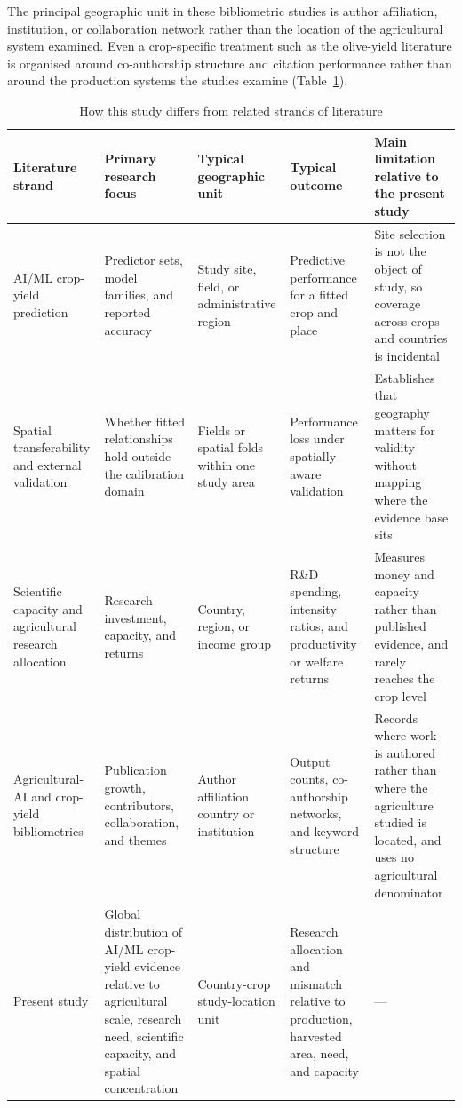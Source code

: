 \documentclass[ASNA,twocolumn]{USG}
\begin{document}
The principal geographic unit in these bibliometric studies is author affiliation,
institution, or collaboration network rather than the location of the agricultural system
examined. Even a crop-specific treatment such as the olive-yield literature is organised
around co-authorship structure and citation performance rather than around the production
systems the studies examine \cite{Toscano2026} (Table~\ref{tab:synthesis}).

\begin{table}[!t]
\centering
\footnotesize
\setlength{\tabcolsep}{4pt}
\renewcommand{\arraystretch}{1.15}
\caption{How this study differs from related strands of literature}
\label{tab:synthesis}
\begin{tabular}{@{}>{\raggedright\arraybackslash}p{2.05cm}
                  >{\raggedright\arraybackslash}p{3.15cm}
                  >{\raggedright\arraybackslash}p{2.25cm}
                  >{\raggedright\arraybackslash}p{3.05cm}
                  >{\raggedright\arraybackslash}p{3.35cm}@{}}
\toprule
Literature strand & Primary research focus & Typical geographic unit & Typical outcome &
Main limitation relative to the present study \\
\midrule
AI/ML crop-yield prediction &
Predictor sets, model families, and reported accuracy &
Study site, field, or administrative region &
Predictive performance for a fitted crop and place &
Site selection is not the object of study, so coverage across crops and countries is
incidental \\
\addlinespace
Spatial transferability and external validation &
Whether fitted relationships hold outside the calibration domain &
Fields or spatial folds within one study area &
Performance loss under spatially aware validation &
Establishes that geography matters for validity without mapping where the evidence base
sits \\
\addlinespace
Scientific capacity and agricultural research allocation &
Research investment, capacity, and returns &
Country, region, or income group &
R\&D spending, intensity ratios, and productivity or welfare returns &
Measures money and capacity rather than published evidence, and rarely reaches the crop
level \\
\addlinespace
Agricultural-AI and crop-yield bibliometrics &
Publication growth, contributors, collaboration, and themes &
Author affiliation country or institution &
Output counts, co-authorship networks, and keyword structure &
Records where work is authored rather than where the agriculture studied is located, and
uses no agricultural denominator \\
\addlinespace
Present study &
Global distribution of AI/ML crop-yield evidence relative to agricultural scale,
research need, scientific capacity, and spatial concentration &
Country-crop study-location unit &
Research allocation and mismatch relative to production, harvested area, need, and
capacity &
--- \\
\bottomrule
\end{tabular}
\end{table}
\end{document}
